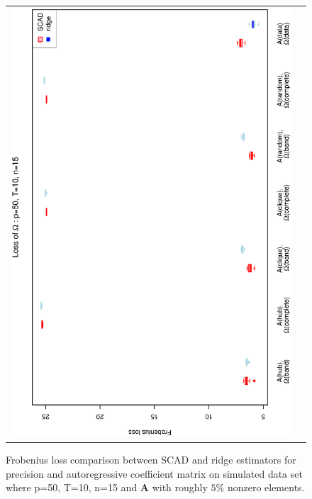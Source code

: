 \begin{figure}[h!]
\begin{tabular}{cc}
\includegraphics[scale=0.45,angle=270]{LossOmega50T10N15_5.eps}
\end{tabular}
\caption{Frobenius loss comparison between SCAD and ridge estimators for precision and autoregressive coefficient matrix on simulated data set where p=50, T=10, n=15  and $\mathbf{A}$ with roughly $5\%$ nonzero elements.}
\label{figSM:Loss50T10N15_5}
\end{figure}



